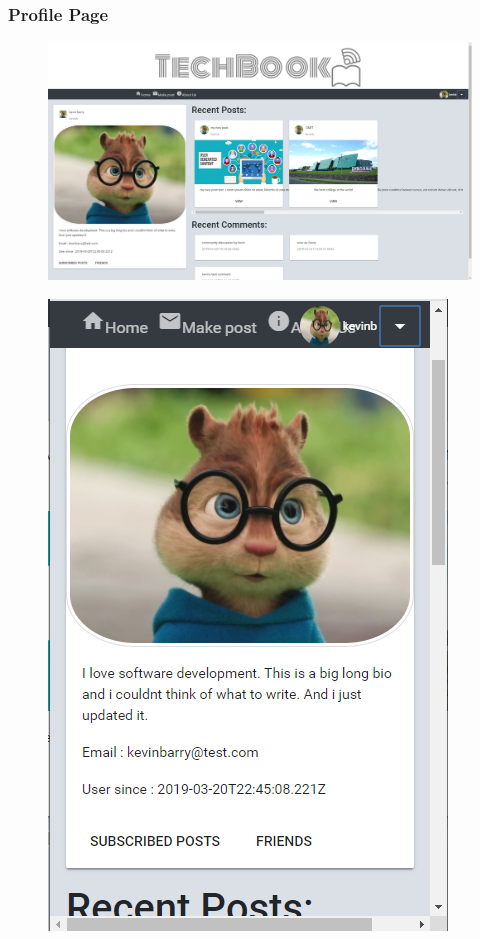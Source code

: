 \subsubsection{Profile Page}
\begin{figure}[H]
\centering
\begin{minipage}{.75\textwidth}
  \centering
  \includegraphics[width=.9\linewidth]{img/ui/profile_PC.PNG}
  \label{fig:profilePC}
\end{minipage}%
\begin{minipage}{.25\textwidth}
  \centering
  \includegraphics[width=.9\linewidth]{img/ui/profile_MOBILE.PNG}
  \label{fig:profileMOBILE}
\end{minipage}
\end{figure}


